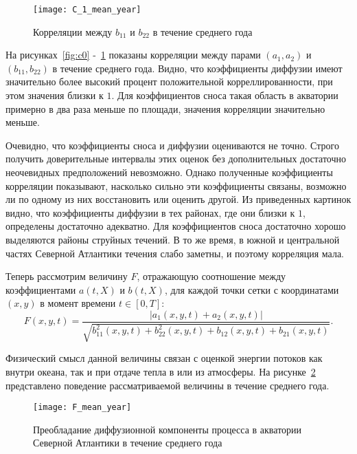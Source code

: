\begin{figure}[h!]
	\centering
	\texttt{[image: C\_1\_mean\_year]}
	\caption{Корреляции между $b_{11}$ и $b_{22}$ в течение среднего года}
	\label{fig:c1}
\end{figure}

На рисунках~\ref{fig:c0} -~\ref{fig:c1} показаны корреляции между парами $(a_1, a_2)$ и $(b_{11}, b_{22})$ в течение среднего года. Видно, что коэффициенты диффузии имеют значительно более высокий процент положительной корреллированности, при этом значения близки к $1$. Для коэффициентов сноса такая область в акватории примерно в два раза меньше по площади, значения корреляции значительно меньше. 

Очевидно, что коэффициенты сноса и диффузии оцениваются не точно. Строго получить доверительные интервалы этих оценок без дополнительных достаточно неочевидных предположений невозможно. Однако полученные коэффициенты корреляции показывают, насколько сильно эти коэффициенты связаны, возможно ли по одному из них восстановить или оценить другой. Из приведенных картинок видно, что коэффициенты диффузии в тех районах, где они близки к $1$, определены достаточно адекватно. Для коэффициентов сноса достаточно хорошо выделяются районы струйных течений. В то же время, в южной и центральной частях Северной Атлантики течения слабо заметны, и поэтому корреляция мала.

Теперь рассмотрим величину $F$, отражающую соотношение между коэффициентами $a(t,X)$ и $b(t,X)$, для каждой точки сетки с координатами $(x,y)$ в момент времени $t \in [0,T]$: 
\begin{equation}
	F(x,y,t) = \frac{|a_1(x,y,t) + a_2(x,y,t)|}{\sqrt{b_{11}^2(x,y,t) + b_{22}^2(x,y,t) + b_{12}(x,y,t) + b_{21}(x,y,t)}}.
\end{equation}

Физический смысл данной величины связан с оценкой энергии потоков как внутри океана, так и при отдаче тепла в или из атмосферы. На рисунке~\ref{fig:f_mean_year} представлено поведение рассматриваемой величины в течение среднего года.

\begin{figure}[!h]
	\centering
	\texttt{[image: F\_mean\_year]}
	\caption{Преобладание диффузионной компоненты процесса в акватории Северной Атлантики в течение среднего года}
	\label{fig:f_mean_year}
\end{figure}

